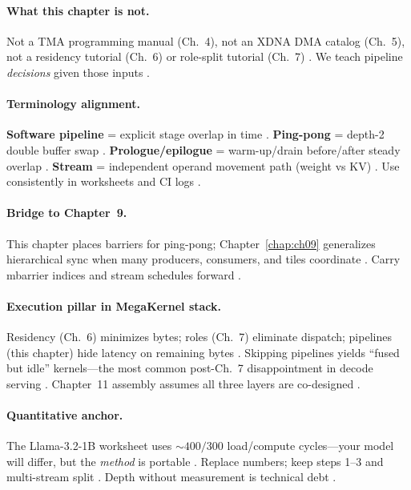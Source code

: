 \paragraph{What this chapter is not.}
Not a TMA programming manual (Ch.~4), not an XDNA DMA catalog (Ch.~5), not a residency tutorial (Ch.~6) or role-split tutorial (Ch.~7) \citep{nvidia2022hopper,amd2024xdna,chen2020compilerbasedhardw}.
We teach pipeline \emph{decisions} given those inputs \citep{yirage2026,dlbook}.

\paragraph{Terminology alignment.}
\textbf{Software pipeline} = explicit stage overlap in time \citep{dao2022flashattention,semianalysis2024tma}.
\textbf{Ping-pong} = depth-2 double buffer swap \citep{shah2024flashattention3,yirage2026}.
\textbf{Prologue/epilogue} = warm-up/drain before/after steady overlap \citep{dlbook,patel2025llminference}.
\textbf{Stream} = independent operand movement path (weight vs KV) \citep{kwon2023vllm,dao2023flashdecoding}.
Use consistently in worksheets and CI logs \citep{chen2020compilerbasedhardw,taxbreak2026}.

\paragraph{Bridge to Chapter~9.}
This chapter places barriers for ping-pong; Chapter~\ref{chap:ch09} generalizes hierarchical sync when many producers, consumers, and tiles coordinate \citep{taxbreak2026,shah2024flashattention3,patel2025llminference}.
Carry mbarrier indices and stream schedules forward \citep{yirage2026,semianalysis2024tma}.

\paragraph{Execution pillar in MegaKernel stack.}
Residency (Ch.~6) minimizes bytes; roles (Ch.~7) eliminate dispatch; pipelines (this chapter) hide latency on remaining bytes \citep{dao2022flashattention,shah2024flashattention3,yirage2026,memoryfloor2026}.
Skipping pipelines yields ``fused but idle'' kernels---the most common post-Ch.~7 disappointment in decode serving \citep{taxbreak2026,patel2025llminference,semianalysis2024tma}.
Chapter~11 assembly assumes all three layers are co-designed \citep{mpk2025,wu2024mirage,chen2020compilerbasedhardw}.

\paragraph{Quantitative anchor.}
The Llama-3.2-1B worksheet uses ${\sim}400/300$ load/compute cycles---your model will differ, but the \emph{method} is portable \citep{taxbreak2026,shah2024flashattention3,kwon2023vllm}.
Replace numbers; keep steps 1--3 and multi-stream split \citep{yirage2026,patel2025llminference,memoryfloor2026}.
Depth without measurement is technical debt \citep{chen2020compilerbasedhardw,dao2022flashattention}.

